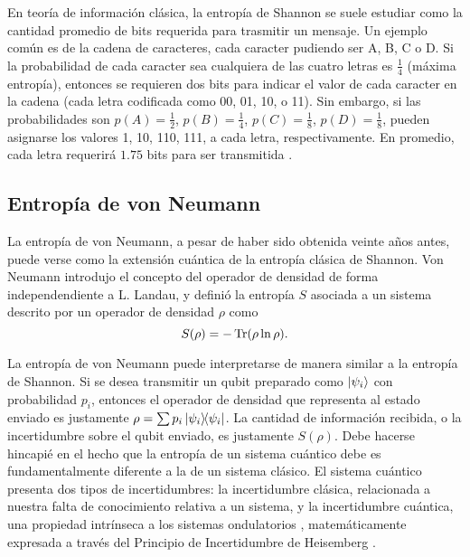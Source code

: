 En teoría de información clásica, la entropía de Shannon se suele estudiar como la cantidad promedio de bits requerida para trasmitir un mensaje. Un ejemplo común es de la cadena de caracteres, cada caracter pudiendo ser A, B, C o D. Si la probabilidad de cada caracter sea cualquiera de las cuatro letras es $\frac{1}{4}$ (máxima entropía), entonces se requieren dos bits para indicar el valor de cada caracter en la cadena (cada letra codificada como 00, 01, 10, o 11). Sin embargo, si las probabilidades son $p(A)=\frac{1}{2}$, $p(B)=\frac{1}{4}$, $p(C)=\frac{1}{8}$, $p(D)=\frac{1}{8}$, pueden asignarse los valores 1, 10, 110, 111, a cada letra, respectivamente. En promedio, cada letra requerirá $1.75$ bits para ser transmitida \cite{Chuang}. 

\subsection{Entropía de von Neumann}

La entropía de von Neumann, a pesar de haber sido obtenida veinte años antes, puede verse como la extensión cuántica de la entropía clásica de Shannon. Von Neumann introdujo el concepto del operador de densidad de forma independendiente a L. Landau, y definió la entropía $S$ asociada a un sistema descrito por un operador de densidad $\rho$ como \cite{vonNeumann}
\begin{equation}\label{eq:VonNeumannEntropy}
    S(\rho)=-\Tr(\rho\ln{\rho}).
\end{equation}

La entropía de von Neumann puede interpretarse de manera similar a la entropía de Shannon. Si se desea transmitir un qubit preparado como $\ket{\psi_{i}}$ con probabilidad $p_{i}$, entonces el operador de densidad que representa al estado enviado es justamente $\rho=\sum p_{i}\dyad{\psi_{i}}$. La cantidad de información recibida, o la incertidumbre sobre el qubit enviado, es justamente $S(\rho)$. Debe hacerse hincapié en el hecho que la entropía de un sistema cuántico debe es fundamentalmente diferente a la de un sistema clásico. El sistema cuántico presenta dos tipos de incertidumbres: la incertidumbre clásica, relacionada a nuestra falta de conocimiento relativa a un sistema, y la incertidumbre cuántica, una propiedad intrínseca a los sistemas ondulatorios , matemáticamente expresada a través del Principio de Incertidumbre de Heisemberg \cite{Wilde}.

